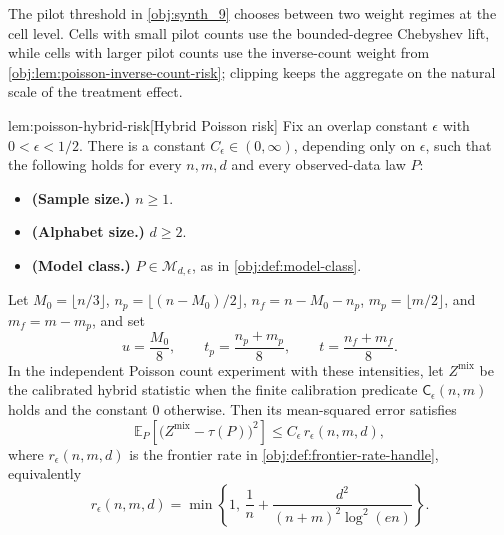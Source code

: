 \documentclass[11pt]{article}
\begin{document}
The pilot threshold in \cref{obj:synth_9} chooses between two weight regimes at the cell level. Cells with small pilot counts use the bounded-degree Chebyshev lift, while cells with larger pilot counts use the inverse-count weight from \cref{obj:lem:poisson-inverse-count-risk}; clipping keeps the aggregate on the natural scale of the treatment effect.

\begin{lemmav}{lem:poisson-hybrid-risk}[Hybrid Poisson risk]
Fix an overlap constant \(\epsilon\) with \(0<\epsilon<1/2\).  There is a constant \(C_\epsilon\in(0,\infty)\), depending only on \(\epsilon\), such that the following holds for every \(n,m,d\) and every observed-data law \(P\):
\begin{itemize}
\item \textbf{(Sample size.)} \(n\ge 1\).
\item \textbf{(Alphabet size.)} \(d\ge 2\).
\item \textbf{(Model class.)} \(P\in\mathcal M_{d,\epsilon}\), as in \cref{obj:def:model-class}.
\end{itemize}
Let \(M_0=\lfloor n/3\rfloor\), \(n_p=\lfloor(n-M_0)/2\rfloor\), \(n_f=n-M_0-n_p\), \(m_p=\lfloor m/2\rfloor\), and \(m_f=m-m_p\), and set
\[
u=\frac{M_0}{8},
\qquad
t_p=\frac{n_p+m_p}{8},
\qquad
t=\frac{n_f+m_f}{8}.
\]
In the independent Poisson count experiment with these intensities, let \(Z^{\mathrm{mix}}\) be the calibrated hybrid statistic when the finite calibration predicate \(\mathsf C_\epsilon(n,m)\) holds and the constant \(0\) otherwise.  Then its mean-squared error satisfies
\[
\mathbb E_P\!\left[\bigl(Z^{\mathrm{mix}}-\tau(P)\bigr)^2\right]
\le
C_\epsilon\, r_\epsilon(n,m,d),
\]
where \(r_\epsilon(n,m,d)\) is the frontier rate in \cref{obj:def:frontier-rate-handle}, equivalently
\[
r_\epsilon(n,m,d)
=
\min\!\left\{
1,\,
\frac1n+
\frac{d^2}{(n+m)^2\log^2(en)}
\right\}.
\]
\end{lemmav}
\end{document}
